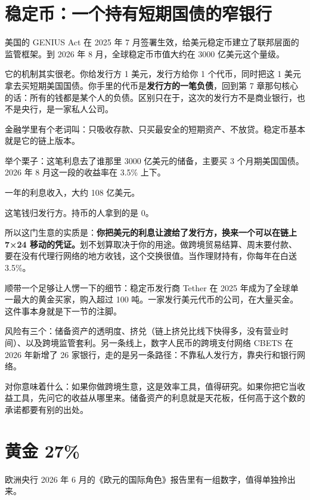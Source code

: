 \section{稳定币：一个持有短期国债的窄银行}

美国的 GENIUS Act 在 2025 年 7 月签署生效，给美元稳定币建立了联邦层面的监管框架。到 2026 年 8 月，全球稳定币市值大约在 3000 亿美元这个量级。

它的机制其实很老。你给发行方 1 美元，发行方给你 1 个代币，同时把这 1 美元拿去买短期美国国债。你手里的代币是\textbf{发行方的一笔负债}，回到第 7 章那句核心的话：所有的钱都是某个人的负债。区别只在于，这次的发行方不是商业银行，也不是央行，是一家私人公司。

金融学里有个老词叫：只吸收存款、只买最安全的短期资产、不放贷。稳定币基本就是它的链上版本。

\begin{egbox}{举个栗子：这笔利息去了谁那里}
3000 亿美元的储备，主要买 3 个月期美国国债。2026 年 8 月这一段的收益率在 3.5\% 上下。

一年的利息收入，大约 108 亿美元。

这笔钱归发行方。持币的人拿到的是 0。

所以这门生意的实质是：\textbf{你把美元的利息让渡给了发行方，换来一个可以在链上 7×24 移动的凭证。}划不划算取决于你的用途。做跨境贸易结算、周末要付款、要在没有代理行网络的地方收钱，这个交换很值。当作理财持有，你每年在白送 3.5\%。

\end{egbox}

顺带一个足够让人愣一下的细节：稳定币发行商 Tether 在 2025 年成为了全球单一最大的黄金买家，购入超过 100 吨。一家发行美元代币的公司，在大量买金。这件事本身就是下一节的注脚。

风险有三个：储备资产的透明度、挤兑（链上挤兑比线下快得多，没有营业时间）、以及跨境监管套利。另一条线上，数字人民币的跨境支付网络 CBETS 在 2026 年新增了 26 家银行，走的是另一条路径：不靠私人发行方，靠央行和银行网络。

对你意味着什么：如果你做跨境生意，这是效率工具，值得研究。如果你把它当收益工具，先问它的收益从哪里来。储备资产的利息就是天花板，任何高于这个数的承诺都要有别的出处。

\section{黄金 27\%}

欧洲央行 2026 年 6 月的《欧元的国际角色》报告里有一组数字，值得单独拎出来。

